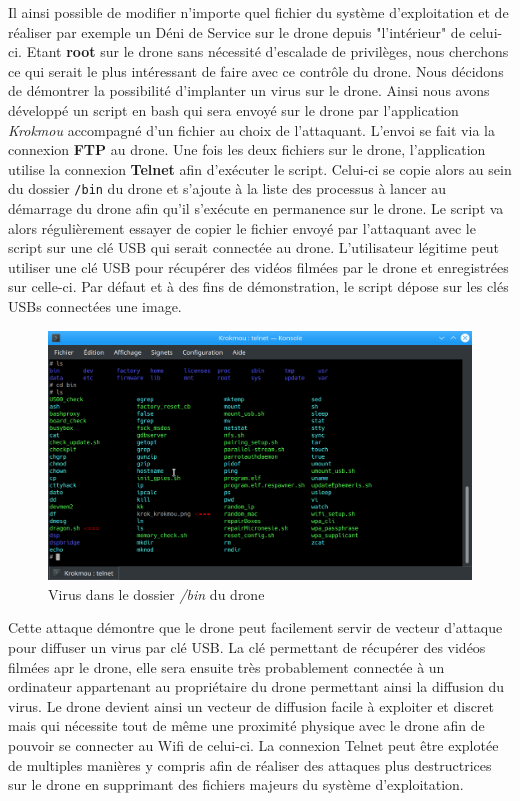 Il ainsi possible de modifier n'importe quel fichier du système d'exploitation et de réaliser par exemple un Déni de Service sur le drone depuis "l'intérieur" de celui-ci. Etant \textbf{root} sur le drone sans nécessité d'escalade de privilèges, nous cherchons ce qui serait le plus intéressant de faire avec ce contrôle du drone. Nous décidons de démontrer la possibilité d'implanter un virus sur le drone. Ainsi nous avons développé un script en bash qui sera envoyé sur le drone par l'application \textit{Krokmou} accompagné d'un fichier au choix de l'attaquant. L'envoi se fait via la connexion \textbf{FTP} au drone. Une fois les deux fichiers sur le drone, l'application utilise la connexion \textbf{Telnet} afin d'exécuter le script. Celui-ci se copie alors au sein du dossier \verb!/bin! du drone et s'ajoute à la liste des processus à lancer au démarrage du drone afin qu'il s'exécute en permanence sur le drone. Le script va alors régulièrement essayer de copier le fichier envoyé par l'attaquant avec le script sur une clé USB qui serait connectée au drone. L'utilisateur légitime peut utiliser une clé USB pour récupérer des vidéos filmées par le drone et enregistrées sur celle-ci. Par défaut et à des fins de démonstration, le script dépose sur les clés USBs connectées une image.

\begin{figure}[H]
  \centering
  \includegraphics[scale=0.35]{images/bin_folder.png}
  \caption{Virus dans le dossier \textit{/bin} du drone}
\end{figure}

Cette attaque démontre que le drone peut facilement servir de vecteur d'attaque pour diffuser un virus par clé USB. La clé permettant de récupérer des vidéos filmées apr le drone, elle sera ensuite très probablement connectée à un ordinateur appartenant au propriétaire du drone permettant ainsi la diffusion du virus. Le drone devient ainsi un vecteur de diffusion facile à exploiter et discret mais qui nécessite tout de même une proximité physique avec le drone afin de pouvoir se connecter au Wifi de celui-ci.
\newline La connexion Telnet peut être explotée de multiples manières y compris afin de réaliser des attaques plus destructrices sur le drone en supprimant des fichiers majeurs du système d'exploitation.
